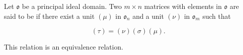Let $\mathfrak{o}$ be a principal ideal domain. Two $m \times n$ matrices with elements in $\mathfrak{o}$ are said to be  if there exist a unit $(\mu)$ in $\mathfrak{o}_n$ and a unit $(\nu)$ in $\mathfrak{o}_m$ such that

$$(\tau) = (\nu)(\sigma)(\mu).$$

This relation is an equivalence relation.
